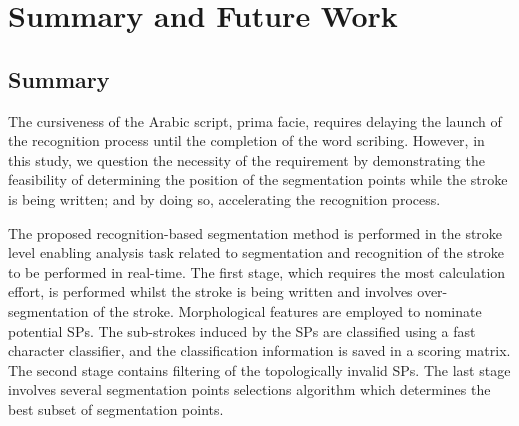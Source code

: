 %
%
%

\chapter{Summary and Future Work}
\label{chap:summary}

\section{Summary}
\label{sec:summary}

The cursiveness of the Arabic script, prima facie, requires delaying the launch of the recognition process until the completion of the word scribing. 
However, in this study, we question the necessity of the requirement by demonstrating the feasibility of determining the position of the segmentation points while the stroke is being written; and by doing so, accelerating the recognition process.

The proposed recognition-based segmentation method is performed in the stroke level enabling analysis task related to segmentation and recognition of the stroke to be performed in real-time. 
The first stage, which requires the most calculation effort, is performed whilst the stroke is being written and involves over-segmentation of the stroke.
Morphological features are employed to nominate potential SPs.
The sub-strokes induced by the SPs are classified using a fast character classifier, and the classification information is saved in a scoring matrix.
The second stage contains filtering of the topologically invalid SPs. 
The last stage involves several segmentation points selections algorithm which determines the best subset of segmentation points.


